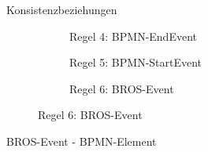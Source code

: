 \begin{frame}{Konsistenzbeziehungen}
\begin{figure}
      \begin{subfigure}{0.3\textwidth}
          \vspace{4pt}
          \centering
          \begin{adjustbox}{width=0.8\linewidth,center}
          \end{adjustbox}
          \caption*{\tiny{\textcolor{black!20}{Regel 4: BPMN-EndEvent}}}%
      \end{subfigure}
      \hfill
      \begin{subfigure}{0.3\textwidth}
          \vspace{4pt}
          \centering
          \begin{adjustbox}{width=0.8\linewidth,center}
          \end{adjustbox}
          \caption*{\tiny{\textcolor{black!20}{Regel 5: BPMN-StartEvent}}}%
      \end{subfigure}
      \hfill
      \begin{subfigure}{0.3\textwidth}
          \vspace{4pt}
          \centering
          \begin{adjustbox}{width=0.8\linewidth,center}
          \end{adjustbox}
          \caption*{\tiny{Regel 6: BROS-Event}}%
      \end{subfigure}
    \end{figure}
  \end{frame}

\begin{frame}{BROS-Event - BPMN-Element}
    \begin{figure}
      \centering
      \begin{adjustbox}{width=0.5\linewidth,center}
        
      \end{adjustbox}
    \end{figure}
\end{frame}

